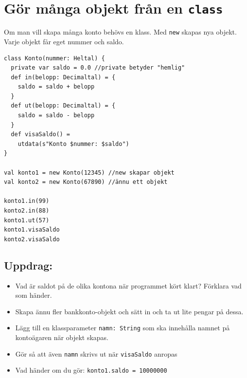 \chapter{Gör många objekt från en \lstinline{class}}
\begin{multicols}{2}
Om man vill skapa många konto behövs en klass. Med \lstinline{new} skapas nya objekt. Varje objekt får eget nummer och saldo.

\begin{lstlisting}[basicstyle={\ttfamily\fontsize{13}{16}\selectfont},numbers=none]
class Konto(nummer: Heltal) {
  private var saldo = 0.0 //private betyder "hemlig"  
  def in(belopp: Decimaltal) = {
    saldo = saldo + belopp
  }
  def ut(belopp: Decimaltal) = {
    saldo = saldo - belopp
  }
  def visaSaldo() = 
    utdata(s"Konto $nummer: $saldo")
}

val konto1 = new Konto(12345) //new skapar objekt 
val konto2 = new Konto(67890) //ännu ett objekt

konto1.in(99)
konto2.in(88)
konto1.ut(57)
konto1.visaSaldo
konto2.visaSaldo
\end{lstlisting}
        


\columnbreak


\section*{\color{BrickRed}Uppdrag:}


\begin{itemize}

\item {Vad är saldot på de olika kontona när programmet kört klart? Förklara vad som händer.}
\item {Skapa ännu fler bankkonto-objekt och sätt in och ta ut lite pengar på dessa.}
\item {Lägg till en klassparameter \lstinline{namn: String} som ska innehålla namnet på kontoägaren när objekt skapas.}
\item {Gör så att även \lstinline{namn} skrivs ut när \lstinline{visaSaldo} anropas}
\item {Vad händer om du gör: \lstinline{konto1.saldo = 10000000 }}

\end{itemize}


\end{multicols}

